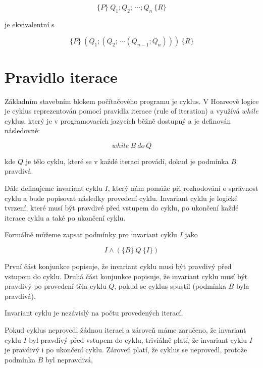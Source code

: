 \begin{equation*}
    \{ P \} \  Q_1; Q_2; \  \cdots ; Q_n \  \{ R \}
\end{equation*}

je ekvivalentní s

\begin{equation*}
    \{ P \} \  (Q_1; (Q_2; \  \cdots (Q_{n-1}; Q_n))) \  \{ R \}
\end{equation*}

\section{Pravidlo iterace}
\label{sec:hoare-pravidlo-iterace}

Základním stavebním blokem počítačového programu je cyklus.
V Hoareově logice je cyklus reprezentován pomocí pravidla iterace (rule of iteration)
a využívá $while$ cyklus, který je v programovacích jazycích běžně dostupný a je definován následovně:

\begin{equation*}
    while \  B \  do \  Q
\end{equation*}

kde $Q$ je tělo cyklu, které se v každé iteraci provádí, dokud je podmínka $B$ pravdivá.

Dále definujeme invariant cyklu $I$, který nám pomůže
při rozhodování o správnost cyklu a bude popisovat následky provedení cyklu.
Invariant cyklu je logické tvrzení, které musí být pravdivé před vstupem do cyklu,
po ukončení každé iterace cyklu a také po ukončení cyklu.

Formálně můžeme zapsat podmínky pro invariant cyklu $I$ jako

\begin{equation*}
    I \land (\{ B \} \  Q \  \{ I \})
\end{equation*}

První část konjunkce popisuje, že invariant cyklu musí být pravdivý před vstupem do cyklu.
Druhá část konjunkce popisuje, že invariant cyklu musí být pravdivý po provedení těla cyklu $Q$,
pokud se cyklus spustil (podmínka $B$ byla pravdivá).

\begin{remark}
    Invariant cyklu je nezávislý na počtu provedených iterací.
\end{remark}

Pokud cyklus neprovedl žádnou iteraci a zároveň máme zaručeno,
že invariant cyklu $I$ byl pravdivý před vstupem do cyklu,
triviálně platí, že invariant cyklu $I$ je pravdivý i po ukončení cyklu.
Zároveň platí, že cyklus se neprovedl, protože podmínka $B$ byl nepravdivá,

